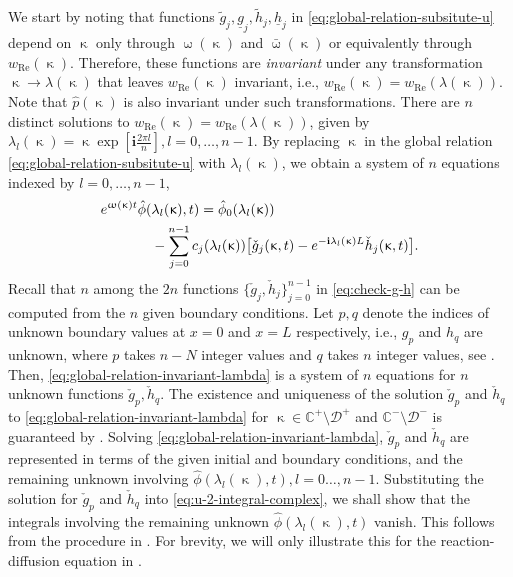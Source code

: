 \documentclass[journal,twoside,web]{ieeecolor}
\newcommand{\CC}{\mathbb{C}}
\newcommand{\D}{\mathcal{D}}
\newcommand{\state}{\phi}
\newcommand{\statehat}{\hat{\state}}
\newcommand{\im}{\mathbf{i}}
\newcommand{\wcomplex}{\upomega}
\newcommand{\kcomplex}{\upkappa}
\begin{document}
We start by noting that functions $\tilde{g}_j,\underline{g}_j, \tilde{h}_j,\underline{h}_j$ in \eqref{eq:global-relation-subsitute-u} depend on $\kcomplex$ only through $\wcomplex(\kcomplex)$ and $\bar{\wcomplex}(\kcomplex)$ or equivalently through $w_{\text{Re}}(\kcomplex)$.
Therefore, these functions are \emph{invariant} under any transformation $\kcomplex\to\lambda(\kcomplex)$ that leaves $w_{\text{Re}}(\kcomplex)$ invariant, i.e., $w_{\text{Re}}(\kcomplex)=w_{\text{Re}}(\lambda(\kcomplex))$.
Note that $\hat{p}(\kcomplex)$ is also invariant under such transformations.
There are $n$ distinct solutions to $w_{\text{Re}}(\kcomplex)=w_{\text{Re}}(\lambda(\kcomplex))$, given by $\lambda_l(\kcomplex)=\kcomplex \exp[\im\frac{ 2\pi l}{n}],l=0,\ldots,n-1$.
By replacing $\kcomplex$ in the global relation \eqref{eq:global-relation-subsitute-u} with $\lambda_l(\kcomplex)$, we obtain a system of $n$ equations indexed by $l=0,\ldots,n-1$,
\begin{equation}\label{eq:global-relation-invariant-lambda}
	\begin{aligned}
		&e^{\wcomplex(\kcomplex)t}\statehat(\lambda_l(\kcomplex),t) = \statehat_0(\lambda_l(\kcomplex))\\
		& \hspace{0.5in} - \sum_{j=0}^{n-1}c_j(\lambda_l(\kcomplex))\big[\check{g}_j(\kcomplex,t)- e^{-\im \lambda_l(\kcomplex) L} \check{h}_j(\kcomplex,t)\big].
	\end{aligned}
\end{equation}
Recall that $n$ among the $2n$ functions $\{\check{g}_j,\check{h}_j\}_{j=0}^{n-1}$ in \eqref{eq:check-g-h} can be computed from the $n$ given boundary conditions.
Let $p,q$ denote the indices of unknown boundary values at $x=0$ and $x=L$ respectively, i.e.,  $g_p$ and $h_q$ are unknown, where $p$ takes $n-N$ integer values and $q$ takes $n$ integer values, see .
Then, \eqref{eq:global-relation-invariant-lambda} is a system of $n$ equations for $n$ unknown functions $\check{g}_p,\check{h}_q$.
The existence and uniqueness of the solution $\check{g}_p$ and $\check{h}_q$ to \eqref{eq:global-relation-invariant-lambda} for $\kcomplex\in\CC^+\setminus\D^+$ and $\CC^-\setminus\D^-$ is guaranteed by  \cite[pg. 65]{fokas2008unified}.   
Solving \eqref{eq:global-relation-invariant-lambda}, $\check{g}_p$ and $\check{h}_q$ are represented in terms of the given initial and boundary conditions, and the remaining unknown involving $\statehat(\lambda_l(\kcomplex),t),l=0\ldots,n-1$.  
Substituting the solution for $\check{g}_p$ and $\check{h}_q$ into \eqref{eq:u-2-integral-complex}, we shall show that the integrals involving the remaining unknown $\statehat(\lambda_l(\kcomplex),t)$ vanish.
This follows from the procedure in \cite[Proposition 1.2]{fokas2008unified}.
For brevity, we will only illustrate this for the reaction-diffusion equation in .
\end{document}
